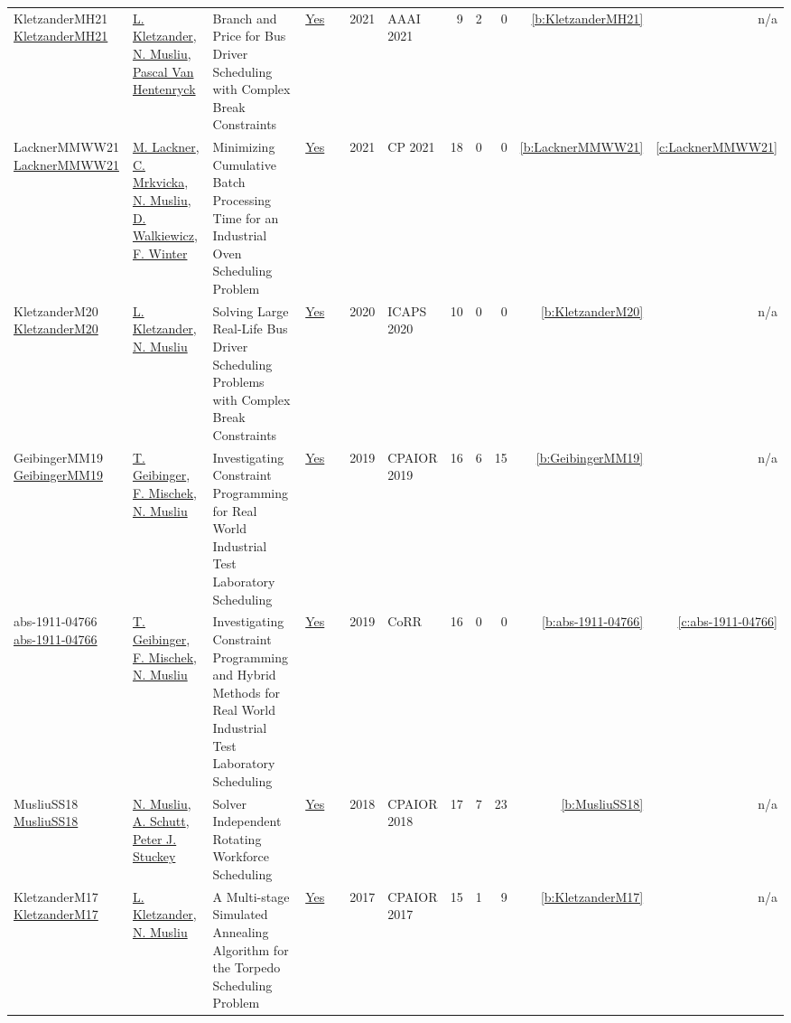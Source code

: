 {\begin{longtable}{>{\raggedright\arraybackslash}p{3cm}>{\raggedright\arraybackslash}p{6cm}>{\raggedright\arraybackslash}p{6.5cm}rrrp{2.5cm}rrrrr}
KletzanderMH21 \href{https://doi.org/10.1609/aaai.v35i13.17408}{KletzanderMH21} & \hyperref[auth:a78]{L. Kletzander}, \hyperref[auth:a45]{N. Musliu}, \hyperref[auth:a149]{Pascal Van Hentenryck} & Branch and Price for Bus Driver Scheduling with Complex Break Constraints & \href{../works/KletzanderMH21.pdf}{Yes} & \cite{KletzanderMH21} & 2021 & AAAI 2021 & 9 & 2 & 0 & \ref{b:KletzanderMH21} & n/a\\
LacknerMMWW21 \href{https://doi.org/10.4230/LIPIcs.CP.2021.37}{LacknerMMWW21} & \hyperref[auth:a62]{M. Lackner}, \hyperref[auth:a63]{C. Mrkvicka}, \hyperref[auth:a45]{N. Musliu}, \hyperref[auth:a46]{D. Walkiewicz}, \hyperref[auth:a43]{F. Winter} & Minimizing Cumulative Batch Processing Time for an Industrial Oven Scheduling Problem & \href{../works/LacknerMMWW21.pdf}{Yes} & \cite{LacknerMMWW21} & 2021 & CP 2021 & 18 & 0 & 0 & \ref{b:LacknerMMWW21} & \ref{c:LacknerMMWW21}\\
KletzanderM20 \href{https://ojs.aaai.org/index.php/ICAPS/article/view/6688}{KletzanderM20} & \hyperref[auth:a78]{L. Kletzander}, \hyperref[auth:a45]{N. Musliu} & Solving Large Real-Life Bus Driver Scheduling Problems with Complex Break Constraints & \href{../works/KletzanderM20.pdf}{Yes} & \cite{KletzanderM20} & 2020 & ICAPS 2020 & 10 & 0 & 0 & \ref{b:KletzanderM20} & n/a\\
GeibingerMM19 \href{https://doi.org/10.1007/978-3-030-19212-9_20}{GeibingerMM19} & \hyperref[auth:a77]{T. Geibinger}, \hyperref[auth:a80]{F. Mischek}, \hyperref[auth:a45]{N. Musliu} & Investigating Constraint Programming for Real World Industrial Test Laboratory Scheduling & \href{../works/GeibingerMM19.pdf}{Yes} & \cite{GeibingerMM19} & 2019 & CPAIOR 2019 & 16 & 6 & 15 & \ref{b:GeibingerMM19} & n/a\\
abs-1911-04766 \href{http://arxiv.org/abs/1911.04766}{abs-1911-04766} & \hyperref[auth:a77]{T. Geibinger}, \hyperref[auth:a80]{F. Mischek}, \hyperref[auth:a45]{N. Musliu} & Investigating Constraint Programming and Hybrid Methods for Real World Industrial Test Laboratory Scheduling & \href{../works/abs-1911-04766.pdf}{Yes} & \cite{abs-1911-04766} & 2019 & CoRR & 16 & 0 & 0 & \ref{b:abs-1911-04766} & \ref{c:abs-1911-04766}\\
MusliuSS18 \href{https://doi.org/10.1007/978-3-319-93031-2_31}{MusliuSS18} & \hyperref[auth:a45]{N. Musliu}, \hyperref[auth:a125]{A. Schutt}, \hyperref[auth:a126]{Peter J. Stuckey} & Solver Independent Rotating Workforce Scheduling & \href{../works/MusliuSS18.pdf}{Yes} & \cite{MusliuSS18} & 2018 & CPAIOR 2018 & 17 & 7 & 23 & \ref{b:MusliuSS18} & n/a\\
KletzanderM17 \href{https://doi.org/10.1007/978-3-319-59776-8_28}{KletzanderM17} & \hyperref[auth:a78]{L. Kletzander}, \hyperref[auth:a45]{N. Musliu} & A Multi-stage Simulated Annealing Algorithm for the Torpedo Scheduling Problem & \href{../works/KletzanderM17.pdf}{Yes} & \cite{KletzanderM17} & 2017 & CPAIOR 2017 & 15 & 1 & 9 & \ref{b:KletzanderM17} & n/a\\
\end{longtable}
}

